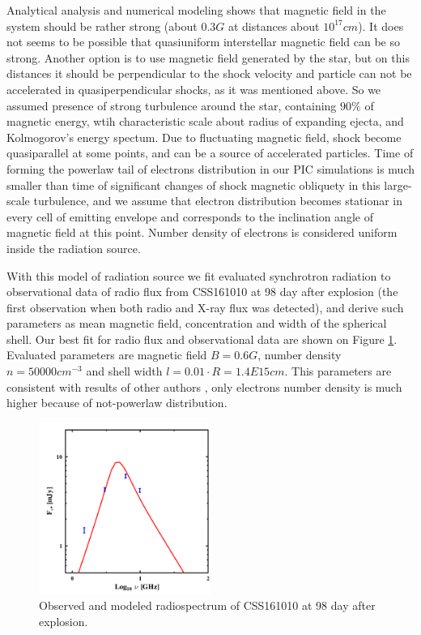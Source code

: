 \documentclass[a4paper,12pt]{extreport}
\begin{document}
Analytical analysis \cite{Coppejans2020} and numerical modeling \cite{BykovUniverse} shows that magnetic field in the system should be rather strong (about $0.3 G$ at distances about $10^{17} cm$). It does not seems to be possible that quasiuniform interstellar magnetic field can be so strong. Another option is to use magnetic field generated by the star, but on this distances it should be perpendicular to the shock velocity \cite{Parker} and particle can not be accelerated in quasiperpendicular shocks, as it was mentioned above. So we assumed presence of strong turbulence around the star, containing $90 \%$ of magnetic energy, wtih characteristic scale about radius of expanding ejecta, and Kolmogorov's energy spectum. Due to fluctuating magnetic field, shock become quasiparallel at some points, and can be a source of accelerated particles. Time of forming the powerlaw tail of electrons distribution in our PIC simulations is much smaller than time of significant changes of shock magnetic obliquety in this large-scale turbulence, and we assume that electron distribution becomes stationar in every cell of emitting envelope and corresponds to the inclination angle of magnetic field at this point. Number density of electrons is considered uniform inside the radiation source.


With this model of radiation source we fit evaluated synchrotron radiation to observational data of radio flux from CSS161010 at 98 day after explosion (the first observation when both radio and X-ray flux was detected), and derive such parameters as mean magnetic field, concentration and width of the spherical shell. Our best fit for radio flux and observational data are shown on Figure \ref{synchrotron}. Evaluated parameters are magnetic field $B = 0.6 G$, number density $n = 50000{cm}^{-3}$ and shell width $l = 0.01\cdot R = 1.4E15 cm$. This parameters are consistent with results of other authors \cite{Coppejans2020}, only electrons number density is much higher because of not-powerlaw distribution. 
\begin{figure}
	\centering
	\includegraphics[width=0.5\textwidth]{./fig/radiation2.png} 
	\caption{Observed and modeled radiospectrum of CSS161010 at 98 day after explosion.}
	\label{synchrotron}
\end{figure}
\end{document}
